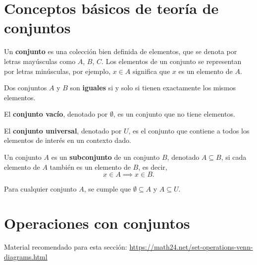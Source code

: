 \documentclass[a4,11pt]{aleph-notas}
\begin{document}
\encabezado

\section{Conceptos básicos de teoría de conjuntos}

\begin{defi}[Conjunto]
    Un \textbf{conjunto} es una colección bien definida de elementos, que se denota por letras mayúsculas como $A$, $B$, $C$. Los elementos de un conjunto se representan por letras minúsculas, por ejemplo, $x \in A$ significa que $x$ es un elemento de $A$.
\end{defi}

\begin{defi}
    Dos conjuntos $A$ y $B$ son \textbf{iguales} si y solo si tienen exactamente los mismos elementos.
\end{defi}


\begin{defi}
    El \textbf{conjunto vacío}, denotado por $\emptyset$, es un conjunto que no tiene elementos.
\end{defi}

\begin{defi}
    El \textbf{conjunto universal}, denotado por $U$, es el conjunto que contiene a todos los elementos de interés en un contexto dado.
\end{defi}

\begin{defi}[Subconjunto]
    Un conjunto $A$ es un \textbf{subconjunto} de un conjunto $B$, denotado $A \subseteq B$, si cada elemento de $A$ también es un elemento de $B$, es decir,
    \[
        x \in A \implies x \in B.
    \]
\end{defi}

\begin{teo}
    Para cualquier conjunto $A$, se cumple que $\emptyset \subseteq A$ y $A \subseteq U$.
\end{teo}

\section{Operaciones con conjuntos}

\begin{advertencia}
    Material recomendado para esta sección: \href{Set Operations and Venn Diagrams}{https://math24.net/set-operations-venn-diagrams.html}
\end{advertencia}
\end{document}
